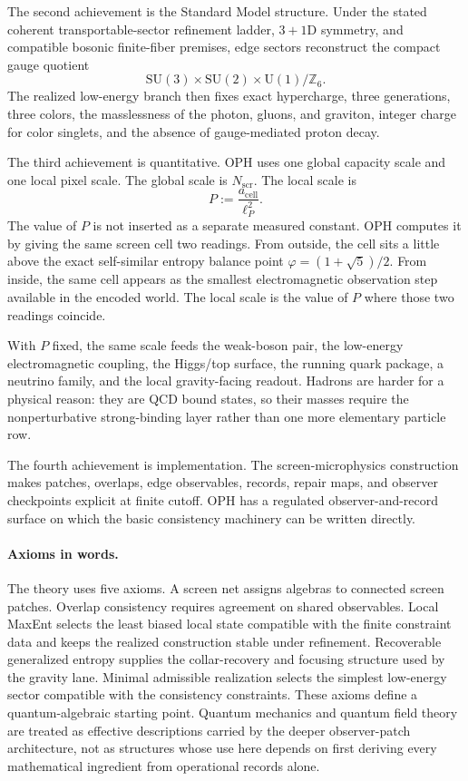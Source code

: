 \documentclass[11pt]{article}
\newcommand{\SU}{\mathrm{SU}}
\newcommand{\U}{\mathrm{U}}
\begin{document}
The second achievement is the Standard Model structure. Under the stated
coherent transportable-sector refinement ladder, \(3+1\)D symmetry, and compatible bosonic finite-fiber premises, edge sectors reconstruct the
compact gauge quotient
\[
\SU(3)\times\SU(2)\times\U(1)/\mathbb Z_6.
\]
The realized low-energy branch then fixes exact hypercharge, three generations, three colors, the
masslessness of the photon, gluons, and graviton, integer charge for color singlets, and the absence
of gauge-mediated proton decay.

The third achievement is quantitative. OPH uses one global capacity scale and one local pixel scale.
The global scale is \(N_{\mathrm{scr}}\). The local scale is
\[
P:=\frac{a_{\mathrm{cell}}}{\ell_P^2}.
\]
The value of \(P\) is not inserted as a separate measured constant. OPH computes it by giving the
same screen cell two readings. From outside, the cell sits a little above the exact self-similar
entropy balance point \(\varphi=(1+\sqrt5)/2\). From inside, the same cell appears as the smallest
electromagnetic observation step available in the encoded world. The local scale is the value of
\(P\) where those two readings coincide.

With \(P\) fixed, the same scale feeds the weak-boson pair, the low-energy electromagnetic coupling,
the Higgs/top surface, the running quark package, a neutrino family, and the local gravity-facing
readout. Hadrons are harder for a physical reason: they are QCD bound states, so their masses require
the nonperturbative strong-binding layer rather than one more elementary particle row.

The fourth achievement is implementation. The screen-microphysics construction makes patches,
overlaps, edge observables, records, repair maps, and observer checkpoints explicit at finite
cutoff. OPH has a regulated observer-and-record surface on which the basic consistency machinery can
be written directly.

\paragraph{Axioms in words.}
The theory uses five axioms. A screen net assigns algebras to connected screen patches. Overlap
consistency requires agreement on shared observables. Local MaxEnt selects the least biased local
state compatible with the finite constraint data and keeps the realized construction stable under
refinement. Recoverable generalized entropy supplies the collar-recovery and focusing structure
used by the gravity lane. Minimal admissible realization selects the simplest low-energy sector
compatible with the consistency constraints. These axioms define a quantum-algebraic
starting point. Quantum mechanics and quantum field theory are treated as effective descriptions
carried by the deeper observer-patch architecture, not as structures whose use here depends on
first deriving every mathematical ingredient from operational records alone.
\end{document}
